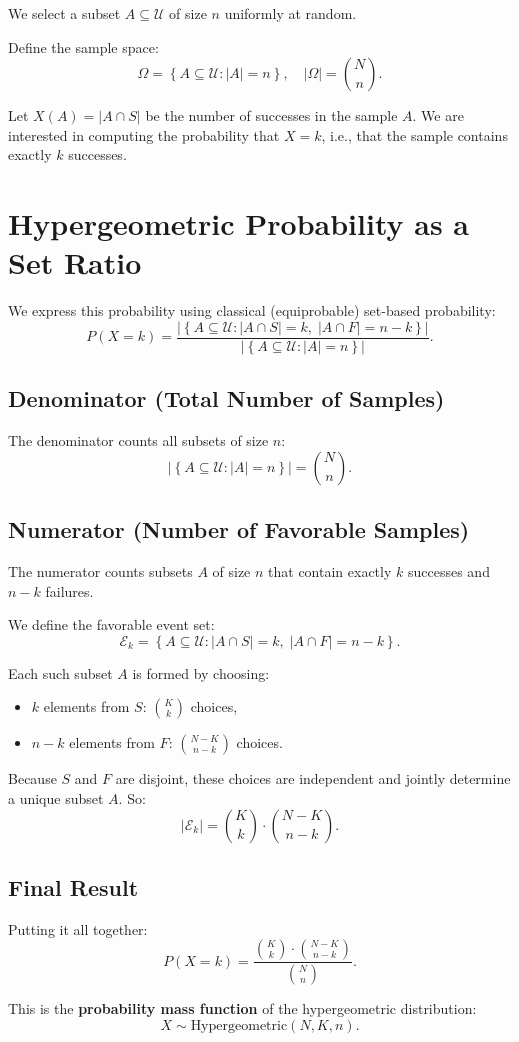\documentclass[12pt]{article}
\begin{document}
We select a subset $A \subseteq \mathcal{U}$ of size $n$ uniformly at random.

Define the sample space:
\[
\Omega = \left\{ A \subseteq \mathcal{U} : |A| = n \right\}, \quad |\Omega| = \binom{N}{n}.
\]

Let $X(A) = |A \cap S|$ be the number of successes in the sample $A$. We are interested in computing the probability that $X = k$, i.e., that the sample contains exactly $k$ successes.

\section*{Hypergeometric Probability as a Set Ratio}

We express this probability using classical (equiprobable) set-based probability:
\[
P(X = k) = \frac{\left|\left\{ A \subseteq \mathcal{U} : |A \cap S| = k,\; |A \cap F| = n - k \right\} \right|}{\left| \left\{ A \subseteq \mathcal{U} : |A| = n \right\} \right|}.
\]

\subsection*{Denominator (Total Number of Samples)}

The denominator counts all subsets of size $n$:
\[
\left| \left\{ A \subseteq \mathcal{U} : |A| = n \right\} \right| = \binom{N}{n}.
\]

\subsection*{Numerator (Number of Favorable Samples)}

The numerator counts subsets $A$ of size $n$ that contain exactly $k$ successes and $n - k$ failures.

We define the favorable event set:
\[
\mathcal{E}_k = \left\{ A \subseteq \mathcal{U} : |A \cap S| = k,\; |A \cap F| = n - k \right\}.
\]

Each such subset $A$ is formed by choosing:
\begin{itemize}
    \item $k$ elements from $S$: $\binom{K}{k}$ choices,
    \item $n - k$ elements from $F$: $\binom{N - K}{n - k}$ choices.
\end{itemize}

Because $S$ and $F$ are disjoint, these choices are independent and jointly determine a unique subset $A$. So:
\[
|\mathcal{E}_k| = \binom{K}{k} \cdot \binom{N - K}{n - k}.
\]

\subsection*{Final Result}

Putting it all together:
\[
P(X = k) = \frac{\binom{K}{k} \cdot \binom{N - K}{n - k}}{\binom{N}{n}}.
\]

This is the \textbf{probability mass function} of the hypergeometric distribution:
\[
X \sim \text{Hypergeometric}(N, K, n).
\]
\end{document}
